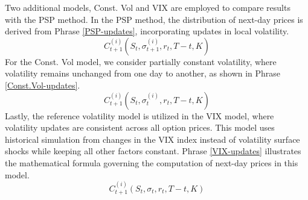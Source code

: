 Two additional models, Const. Vol and VIX are employed to compare results with the PSP method. In the PSP method, the distribution of next-day prices is derived from Phrase \eqref{PSP-updates}, incorporating updates in local volatility.
\begin{equation}
    C_{t+1}^{(i)}(S_t, \sigma_{t+1}^{(i)}, r_t, T-t, K) \label{PSP-updates}
\end{equation}
For the Const. Vol model, we consider partially constant volatility, where volatility remains unchanged from one day to another, as shown in Phrase \eqref{Const.Vol-updates}.
\begin{equation}
    C_{t+1}^{(i)}(S_t, \sigma_{t}^{(i)}, r_t, T-t, K) \label{Const.Vol-updates}
\end{equation}
Lastly, the reference volatility model is utilized in the VIX model, where volatility updates are consistent across all option prices. This model uses historical simulation from changes in the VIX index instead of volatility surface shocks while keeping all other factors constant. Phrase \eqref{VIX-updates} illustrates the mathematical formula governing the computation of next-day prices in this model.
\begin{equation}
    C_{t+1}^{(i)}(S_t, \sigma_{t}, r_t, T-t, K) \label{VIX-updates}
\end{equation}
